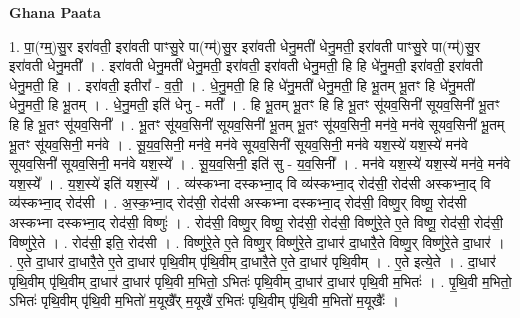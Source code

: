 \documentclass[17pt]{extarticle}
\begin{document}
\textbf{Ghana Paata } \newline

1. पा॒(ग्म्॒)सु॒र इरा॑वती॒ इरा॑वती पाꣳसु॒रे पा(ग्म्॑)सु॒र इरा॑वती धेनु॒मती॑ धेनु॒मती॒ इरा॑वती पाꣳसु॒रे पा(ग्म्॑)सु॒र इरा॑वती धेनु॒मती᳚ । . इरा॑वती धेनु॒मती॑ धेनु॒मती॒ इरा॑वती॒ इरा॑वती धेनु॒मती॒ हि हि धे॑नु॒मती॒ इरा॑वती॒ इरा॑वती धेनु॒मती॒ हि । . इरा॑वती॒ इतीरा᳚ - व॒ती॒ । . धे॒नु॒मती॒ हि हि धे॑नु॒मती॑ धेनु॒मती॒ हि भू॒तम् भू॒तꣳ हि धे॑नु॒मती॑ धेनु॒मती॒ हि भू॒तम् । . धे॒नु॒मती॒ इति॑ धेनु - मती᳚ । . हि भू॒तम् भू॒तꣳ हि हि भू॒तꣳ सू॑यव॒सिनी॑ सूयव॒सिनी॑ भू॒तꣳ हि हि भू॒तꣳ सू॑यव॒सिनी᳚ । . भू॒तꣳ सू॑यव॒सिनी॑ सूयव॒सिनी॑ भू॒तम् भू॒तꣳ सू॑यव॒सिनी॒ मन॑वे॒ मन॑वे सूयव॒सिनी॑ भू॒तम् भू॒तꣳ सू॑यव॒सिनी॒ मन॑वे । . सू॒य॒व॒सिनी॒ मन॑वे॒ मन॑वे सूयव॒सिनी॑ सूयव॒सिनी॒ मन॑वे यश॒स्ये॑ यश॒स्ये॑ मन॑वे सूयव॒सिनी॑ सूयव॒सिनी॒ मन॑वे यश॒स्ये᳚ । . सू॒य॒व॒सिनी॒ इति॑ सु - य॒व॒सिनी᳚ । . मन॑वे यश॒स्ये॑ यश॒स्ये॑ मन॑वे॒ मन॑वे यश॒स्ये᳚ । . य॒श॒स्ये॑ इति॑ यश॒स्ये᳚ । . व्य॑स्कभ्ना दस्कभ्ना॒द् वि व्य॑स्कभ्ना॒द् रोद॑सी॒ रोद॑सी अस्कभ्ना॒द् वि व्य॑स्कभ्ना॒द् रोद॑सी । . अ॒स्क॒भ्ना॒द् रोद॑सी॒ रोद॑सी अस्कभ्ना दस्कभ्ना॒द् रोद॑सी॒ विष्णु॒र् विष्णू॒ रोद॑सी अस्कभ्ना दस्कभ्ना॒द् रोद॑सी॒ विष्णुः॑ । . रोद॑सी॒ विष्णु॒र् विष्णू॒ रोद॑सी॒ रोद॑सी॒ विष्णु॑रे॒ते ए॒ते विष्णू॒ रोद॑सी॒ रोद॑सी॒ विष्णु॑रे॒ते । . रोद॑सी॒ इति॒ रोद॑सी । . विष्णु॑रे॒ते ए॒ते विष्णु॒र् विष्णु॑रे॒ते दा॒धार॑ दा॒धारै॒ते विष्णु॒र् विष्णु॑रे॒ते दा॒धार॑ । . ए॒ते दा॒धार॑ दा॒धारै॒ते ए॒ते दा॒धार॑ पृथि॒वीम् पृ॑थि॒वीम् दा॒धारै॒ते ए॒ते दा॒धार॑ पृथि॒वीम् । . ए॒ते इत्ये॒ते । . दा॒धार॑ पृथि॒वीम् पृ॑थि॒वीम् दा॒धार॑ दा॒धार॑ पृथि॒वी म॒भितो॒ ऽभितः॑ पृथि॒वीम् दा॒धार॑ दा॒धार॑ पृथि॒वी म॒भितः॑ । . पृ॒थि॒वी म॒भितो॒ ऽभितः॑ पृथि॒वीम् पृ॑थि॒वी म॒भितो॑ म॒यूखै᳚र् म॒यूखै॑ र॒भितः॑ पृथि॒वीम् पृ॑थि॒वी म॒भितो॑ म॒यूखैः᳚ । \newline
\end{document}
